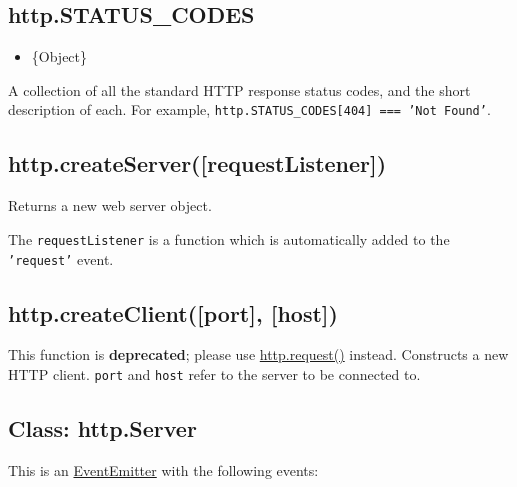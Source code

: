 \begin{Shaded}
\begin{Highlighting}[]
\NormalTok{[ }\NormalTok{, }\NormalTok{,}
  \NormalTok{, }\NormalTok{,}
  \NormalTok{, }\NormalTok{,}
  \NormalTok{, }\NormalTok{,}
  \NormalTok{, }\NormalTok{,}
  \NormalTok{, } \NormalTok{]}
\end{Highlighting}
\end{Shaded}

\subsection{http.STATUS\_CODES}

\begin{itemize}
\item
  \{Object\}
\end{itemize}

A collection of all the standard HTTP response status codes, and the
short description of each. For example,
\texttt{http.STATUS\_CODES{[}404{]} === 'Not Found'}.

\subsection{http.createServer({[}requestListener{]})}

Returns a new web server object.

The \texttt{requestListener} is a function which is automatically added
to the \texttt{'request'} event.

\subsection{http.createClient({[}port{]}, {[}host{]})}

This function is \textbf{deprecated}; please use
\hyperref[http\_http\_request\_options\_callback]{http.request()}
instead. Constructs a new HTTP client. \texttt{port} and \texttt{host}
refer to the server to be connected to.

\subsection{Class: http.Server}

This is an
\href{events.html\#events\_class\_events\_eventemitter}{EventEmitter}
with the following events:

